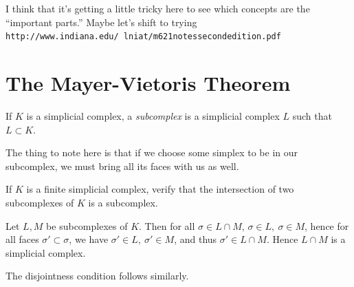 \begin{note}
  \color{green} I think that it's getting a little tricky here to see which
  concepts are the ``important parts.'' Maybe let's shift to trying
  \texttt{http://www.indiana.edu/~lniat/m621notessecondedition.pdf}
\end{note}

\section{The Mayer-Vietoris Theorem}
\begin{definition}[Subcomplex]
  If $K$ is a simplicial complex, a \emph{subcomplex} is a simplicial complex
  $L$ such that $L \subset K$.
\end{definition}
\begin{note}
  The thing to note here is that if we choose some simplex to be in our
  subcomplex, we must bring all its faces with us as well.
\end{note}
\begin{problem}[16.31]
  If $K$ is a finite simplicial complex, verify that the intersection of two
  subcomplexes of $K$ is a subcomplex.
\end{problem}
\begin{solution}
  Let $L, M$ be subcomplexes of $K$. Then for all $\sigma \in L \cap
  M$, $\sigma \in L,\ \sigma \in M$, hence for all faces $\sigma'
  \subset \sigma$, we have $\sigma' \in L,\ \sigma' \in M$, and thus
  $\sigma'\in L \cap M$. Hence $L \cap M$ is a simplicial complex.

  The disjointness condition follows similarly.
\end{solution}

